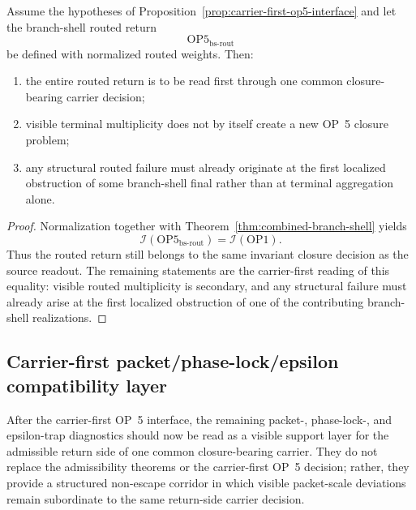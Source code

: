 \begin{corollary}
\label{cor:carrier-first-routed-op5}
Assume the hypotheses of Proposition~\ref{prop:carrier-first-op5-interface} and let the branch-shell routed return
\[
\mathrm{OP5}_{\mathrm{bs\text{-}rout}}
\]
be defined with normalized routed weights. Then:
\begin{enumerate}[leftmargin=2em,label=(\roman*)]
\item the entire routed return is to be read first through one common closure-bearing carrier decision;
\item visible terminal multiplicity does not by itself create a new OP~5 closure problem;
\item any structural routed failure must already originate at the first localized obstruction of some branch-shell final rather than at terminal aggregation alone.
\end{enumerate}
\end{corollary}

\begin{proof}
Normalization together with Theorem~\ref{thm:combined-branch-shell} yields
\[
\mathcal{I}(\mathrm{OP5}_{\mathrm{bs\text{-}rout}})=\mathcal{I}(\mathrm{OP1}).
\]
Thus the routed return still belongs to the same invariant closure decision as the source readout. The remaining statements are the carrier-first reading of this equality: visible routed multiplicity is secondary, and any structural failure must already arise at the first localized obstruction of one of the contributing branch-shell realizations.
\end{proof}

\subsection{Carrier-first packet/phase-lock/epsilon compatibility layer}
\label{sec:packet-phase-epsilon-compatibility}

After the carrier-first OP~5 interface, the remaining packet-, phase-lock-, and epsilon-trap diagnostics should now be read as a visible support layer for the admissible return side of one common closure-bearing carrier. They do not replace the admissibility theorems or the carrier-first OP~5 decision; rather, they provide a structured non-escape corridor in which visible packet-scale deviations remain subordinate to the same return-side carrier decision.

